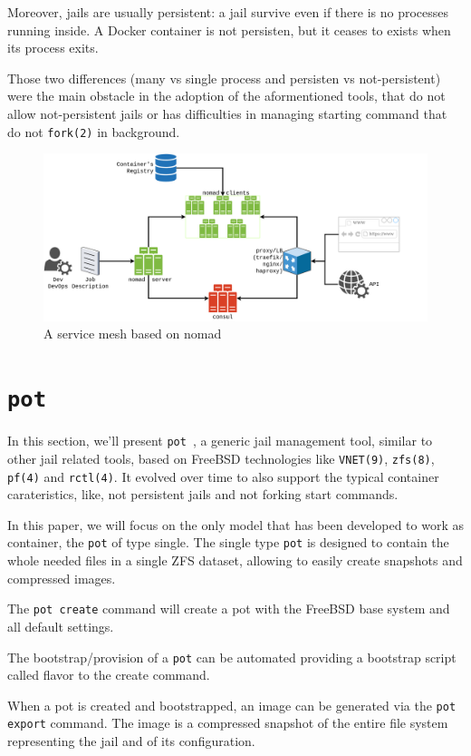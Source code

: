 \documentclass[conference,a4paper,11pt]{IEEEtran}
\begin{document}
Moreover, jails are usually persistent: a jail survive even if there is no processes running inside. A Docker container is not persisten, but it ceases to exists when its process exits.

Those two differences (many vs single process and persisten vs not-persistent) were the main obstacle in the adoption of the aformentioned tools, that do not allow not-persistent jails or has difficulties in managing starting command that do not \texttt{fork(2)} in background.

\begin{figure}[hbt]
\centering
\includegraphics[width=\textwidth]{nomad-frame.png}
\caption{A service mesh based on nomad}
\label{fig:nomad}
\end{figure}
\section{\texttt{pot}}\label{sec:pot}
In this section, we'll present \texttt{pot}~\cite{pot}, a generic jail management tool, similar to other jail related tools, based on FreeBSD technologies like \texttt{VNET(9)}, \texttt{zfs(8)}, \texttt{pf(4)} and \texttt{rctl(4)}. It evolved over time to also support the typical container carateristics, like, not persistent jails and not forking start commands.

In this paper, we will focus on the only model that has been developed to work as container, the \texttt{pot} of type single.
The single type \texttt{pot} is designed to contain the whole needed files in a single ZFS dataset, allowing to easily create snapshots and compressed images.

The \texttt{pot create} command will create a pot with the FreeBSD base system and all default settings.

The bootstrap/provision of a \texttt{pot} can be automated providing a bootstrap script called flavor to the create command.

When a pot is created and bootstrapped, an image can be generated via the \texttt{pot export} command. The image is a compressed snapshot of the entire file system representing the jail and of its configuration.
\end{document}
